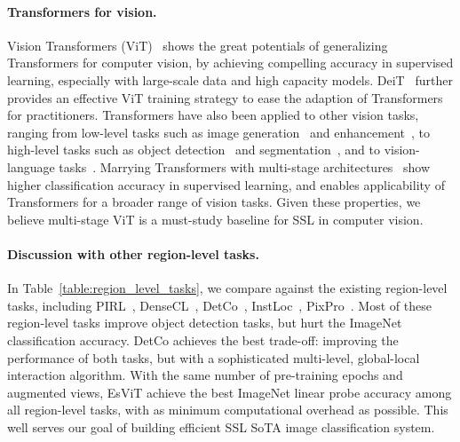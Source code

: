 \documentclass{article} \usepackage{iclr2022_conference,times}
\newcommand{\shortname}{EsViT}
\begin{document}
\paragraph{Transformers for vision.} Vision Transformers (ViT)~\citep{dosovitskiy2020image} shows the great potentials of generalizing Transformers for computer vision, by achieving compelling accuracy in supervised learning, especially with large-scale data and high capacity models. DeiT~\citep{touvron2020training} further provides an effective ViT training strategy to ease the adaption of Transformers for practitioners.
Transformers have also been applied to other vision tasks, ranging from low-level tasks such as image generation~\citep{parmar2018image,chen2020generative} and enhancement~\citep{chen2020pre,yang2020learning}, to high-level tasks such as  object detection~\citep{carion2020end,zhu2020deformable,zheng2020end,dai2020up} and segmentation~\citep{wang2020max,wang2020end}, and to vision-language tasks~\citep{lu2019vilbert,tan2019lxmert,chen2019uniter,su2019vl,li2019visualbert,li2019unicoder,zhou2019unified,li2020oscar}.
Marrying Transformers with multi-stage architectures~\citep{vaswani2021scaling,wang2021pyramid,liu2021Swin,zhang2021vil,wu2021cvt} show higher classification accuracy in supervised learning, and enables applicability of Transformers for a broader range of vision tasks.
Given these properties, we believe multi-stage ViT is a must-study baseline for SSL in computer vision.



\paragraph{Discussion with other region-level tasks.} In Table~\ref{table:region_level_tasks}, we compare  against the existing region-level tasks, including PIRL~\citep{misra2020self}, DenseCL~\citep{wang2020dense}, DetCo~\citep{xie2021detco}, InstLoc~\citep{yang2021instance}, PixPro~\citep{xie2021propagate}. Most of these region-level tasks improve object detection tasks, but hurt the ImageNet classification accuracy. DetCo achieves the best trade-off: improving the performance of both tasks, but with a sophisticated multi-level, global-local interaction algorithm. With the same number of pre-training epochs and augmented views, \shortname{} achieve the best ImageNet linear probe accuracy among all region-level tasks, with as minimum computational overhead as possible. This well serves our goal of building efficient SSL SoTA image classification system.
\end{document}
